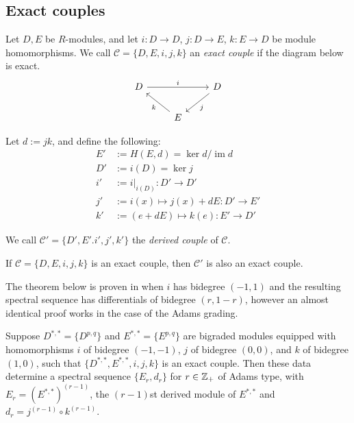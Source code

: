\documentclass{MetricNotes2023}
\def\inte{\ensuremath\mathbb{Z}}
\DeclareMathOperator{\im}{im}
\begin{document}
\subsection{Exact couples}\label{2503301333}

\begin{definition}
Let \(D, E\) be \(R\)-modules, and let \(i : D \to D\), \(j : D\to E\), \(k : E \to D\) be module homomorphisms. We call \(\mathcal{C}=\{D, E, i, j, k\}\) an \textit{exact couple} if the diagram below is exact.
\[\begin{tikzcd}
 D \arrow[rr, "i"] && D \arrow[dl, "j"] \\ 
  & E \arrow[ul, "k"] &  
 \end{tikzcd}\] 
\end{definition}

Let \(d:=jk\), and define the following:
\begin{align*}
E'&:=H(E, d)=\ker d/\im d\\
D'&:=i(D)=\ker j\\
i'&:=i|_{i(D)} : D'\to D'\\
j'&:=i(x)\mapsto j(x)+dE : D'\to E'\\
k'&:=(e+dE)\mapsto k(e) : E' \to D'
\end{align*}

We call \(\mathcal{C}'=\{D', E'. i', j', k'\}\) the \textit{derived couple} of \(\mathcal{C}\). 

\begin{proposition}
If \(\mathcal{C}=\{D, E, i, j, k\}\) is an exact couple, then \(\mathcal{C}'\) is also an exact couple.
\end{proposition}

The theorem below is proven in \autocite{spectral_sequences} when \(i\) has bidegree \((-1, 1)\) and the resulting spectral sequence has differentials of bidegree \((r, 1-r)\), however an almost identical proof works in the case of the Adams grading. 

\begin{theorem}\label{2503301131}
Suppose \(D^{*,*}=\{D^{p,q}\}\) and \(E^{*,*}=\{E^{p,q}\}\) are bigraded modules equipped with homomorphisms \(i\) of bidegree \((-1,-1)\), \(j\) of bidegree \((0,0)\), and \(k\) of bidegree \((1,0)\), such that \(\{D^{*,*}, E^{*,*}, i, j, k\}\) is an exact couple. Then these data determine a spectral sequence \(\{E_r, d_r\}\) for \(r\in \inte_+\) of Adams type, with \(E_r=(E^{*,*})^{(r-1)}\), the \((r-1)\)st derived module of \(E^{*,*}\) and \(d_r=j^{(r-1)}\circ k^{(r-1)}\).
\end{theorem}
\end{document}
